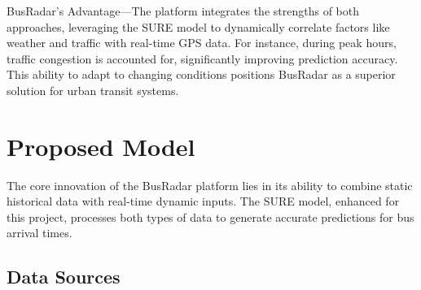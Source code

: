 \documentclass[conference]{IEEEtran}
\begin{document}
BusRadar’s Advantage—The platform integrates the strengths of both approaches, leveraging the SURE model to dynamically correlate factors like weather and traffic with real-time GPS data. For instance, during peak hours, traffic congestion is accounted for, significantly improving prediction accuracy. This ability to adapt to changing conditions positions BusRadar as a superior solution for urban transit systems. 

\section{Proposed Model}
The core innovation of the BusRadar platform lies in its ability to combine static historical data with real-time dynamic inputs. The SURE model, enhanced for this project, processes both types of data to generate accurate predictions for bus arrival times. 

\subsection{Data Sources}
\end{document}
